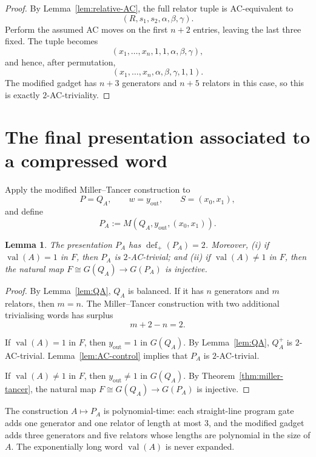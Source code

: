 \documentclass[a4paper,11pt,reqno]{amsart}
\newtheorem{lemma}[theorem]{Lemma}
\theoremstyle{definition}
\theoremstyle{remark}
\DeclareMathOperator{\val}{val}
\newcommand{\defp}{\operatorname{def}_{+}}
\begin{document}
	\begin{proof}
		By Lemma~\ref{lem:relative-AC}, the full relator tuple is AC-equivalent to
		\[
		(R,s_1,s_2,\alpha,\beta,\gamma).
		\]
		Perform the assumed AC moves on the first $n+2$ entries, leaving the last
		three fixed. The tuple becomes
		\[
		(x_1,\dots,x_n,1,1,\alpha,\beta,\gamma),
		\]
		and hence, after permutation,
		\[
		(x_1,\dots,x_n,\alpha,\beta,\gamma,1,1).
		\]
		The modified gadget has $n+3$ generators and $n+5$ relators in this case,
		so this is exactly $2$-AC-triviality.
	\end{proof}
	
	\section{The final presentation associated to a compressed word}
	\label{sec:final-presentation}
	
	Apply the modified Miller--Tancer construction to
	\[
	P=Q_A,
	\qquad
	w=y_{\mathrm{out}},
	\qquad
	S=(x_0,x_1),
	\]
	and define
	\[
	P_A:=M(Q_A,y_{\mathrm{out}},(x_0,x_1)).
	\]
	
	\begin{lemma}\label{lem:PA}
		The presentation $P_A$ has $\defp(P_A)=2$. Moreover, (i) if $\val(A)=1$ in $F$, then $P_A$ is $2$-AC-trivial;
		and (ii) if $\val(A)\ne1$ in $F$, then the natural map
		\(
		F\cong G(Q_A)\longrightarrow G(P_A)
		\)
		is injective.
	\end{lemma}
	
	\begin{proof}
		By Lemma~\ref{lem:QA}, $Q_A$ is balanced. If it has $n$ generators and
		$m$ relators, then $m=n$. The Miller--Tancer construction with two
		additional trivialising words has surplus
		\[
		m+2-n=2.
		\]
		
		If $\val(A)=1$ in $F$, then $y_{\mathrm{out}}=1$ in $G(Q_A)$. By
		Lemma~\ref{lem:QA}, $Q_A^+$ is
		$2$-AC-trivial. Lemma~\ref{lem:AC-control} implies that $P_A$ is
		$2$-AC-trivial.
		
		If $\val(A)\neq1$ in $F$, then $y_{\mathrm{out}}\neq1$ in $G(Q_A)$. By
		Theorem~\ref{thm:miller-tancer}, the natural map
		$F\cong G(Q_A)\to G(P_A)$ is injective.
	\end{proof}
	
	The construction $A\mapsto P_A$ is polynomial-time: each straight-line program
	gate adds one generator and one relator of length at most $3$, and the
	modified gadget adds three generators and five relators whose lengths are
	polynomial in the size of $A$. The exponentially long word $\val(A)$ is
	never expanded.
	
\end{document}
